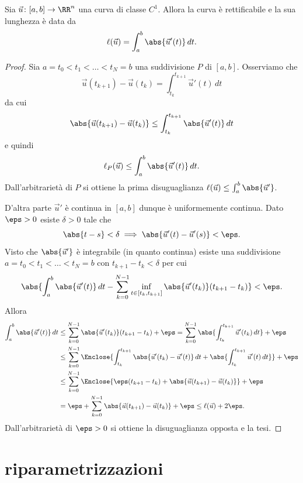 \begin{theorem}
    Sia $\vec u \colon [a,b] \to \RR^n$ una curva di classe $C^1$.
    Allora la curva è rettificabile e la sua lunghezza è data da
    \[
      \ell(\vec u) = \int_a^b \abs{\vec u'(t)} \, dt.
    \]
\end{theorem}
\begin{proof}
Sia $a = t_0 < t_1 < \dots < t_N = b$ una suddivisione $P$ di $[a,b]$.
Osserviamo che 
\[
  \vec u(t_{k+1}) - \vec u(t_k) = \int_{t_k}^{t_{k+1}} \vec u'(t) \, dt
\]
da cui 
\[
 \abs{\vec u(t_{k+1})-\vec u(t_k)} \le \int_{t_k}^{t_{k+1}} \abs{\vec u'(t)} \, dt
\]
e quindi 
\[
  \ell_P(\vec u) \le \int_a^b \abs{\vec u'(t)} \, dt.
\]
Dall'arbitrarietà di $P$ si ottiene la prima disuguaglianza 
$\ell(\vec u) \le \int_a^b \abs{\vec u'}$.

D'altra parte $\vec u'$ è continua in $[a,b]$ dunque è uniformemente continua.
Dato $\eps>0$ esiste $\delta>0$ tale che
\[
  \abs{t-s} < \delta \implies \abs{\vec u'(t) - \vec u'(s)} < \eps.
\]
Visto che $\abs{\vec u'}$ è integrabile (in quanto continua) esiste una suddivisione
$a = t_0 < t_1 < \dots < t_N = b$ con $t_{k+1}-t_k < \delta$ per cui
\[
  \abs{\int_a^b \abs{\vec u'(t)} \, dt - \sum_{k=0}^{N-1} \inf_{t\in [t_k, t_{k+1}]} \abs{\vec u'(t_k)} (t_{k+1}-t_k)} 
  < \eps.
\]
Allora 
\begin{align*}
  \int_a^b \abs{\vec u'(t)} \, dt
    &\le \sum_{k=0}^{N-1} \abs{\vec u'(t_k)} (t_{k+1}-t_k) + \eps
    = \sum_{k=0}^{N-1} \abs{ \int_{t_k}^{t_{k+1}} \vec u'(t_k) \, dt} + \eps \\
    &\le \sum_{k=0}^{N-1} \Enclose{\int_{t_k}^{t_{k+1}} \abs{\vec u'(t_k) - \vec u'(t)} \, dt + \abs{\int_{t_k}^{t_{k+1}} \vec u'(t)\, dt}} + \eps \\
    &\le \sum_{k=0}^{N-1} \Enclose{ \eps (t_{k+1}-t_k) + \abs{\vec u(t_{k+1}) - \vec u(t_k)}} + \eps \\
    &=  \eps + \sum_{k=0}^{N-1}  \abs{\vec u(t_{k+1}) - \vec u(t_k)} + \eps
    \le \ell(\vec u) + 2\eps.
\end{align*}
Dall'arbitrarietà di $\eps>0$ si ottiene la disuguaglianza opposta e la tesi.
\end{proof}

\section{riparametrizzazioni}

